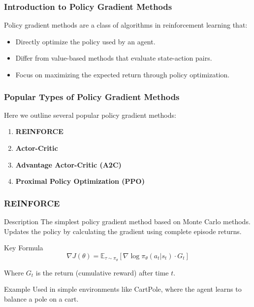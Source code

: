 \documentclass[aspectratio=169]{beamer}
\begin{document}
\begin{frame}[fragile]
    \frametitle{Introduction to Policy Gradient Methods}
    Policy gradient methods are a class of algorithms in reinforcement learning that:
    \begin{itemize}
        \item Directly optimize the policy used by an agent.
        \item Differ from value-based methods that evaluate state-action pairs.
        \item Focus on maximizing the expected return through policy optimization.
    \end{itemize}
\end{frame}

\begin{frame}[fragile]
    \frametitle{Popular Types of Policy Gradient Methods}
    Here we outline several popular policy gradient methods:
    \begin{enumerate}
        \item \textbf{REINFORCE}
        \item \textbf{Actor-Critic}
        \item \textbf{Advantage Actor-Critic (A2C)}
        \item \textbf{Proximal Policy Optimization (PPO)}
    \end{enumerate}
\end{frame}

\begin{frame}[fragile]
    \frametitle{REINFORCE}
    \begin{block}{Description}
        The simplest policy gradient method based on Monte Carlo methods. Updates the policy by calculating the gradient using complete episode returns.
    \end{block}
    \begin{block}{Key Formula}
        \[
        \nabla J(\theta) = \mathbb{E}_{\tau \sim \pi_\theta} \left[ \nabla \log \pi_\theta(a_t | s_t) \cdot G_t \right]
        \]
    \end{block}
    Where \( G_t \) is the return (cumulative reward) after time \( t \).

    \begin{block}{Example}
        Used in simple environments like CartPole, where the agent learns to balance a pole on a cart.
    \end{block}
\end{frame}
\end{document}
